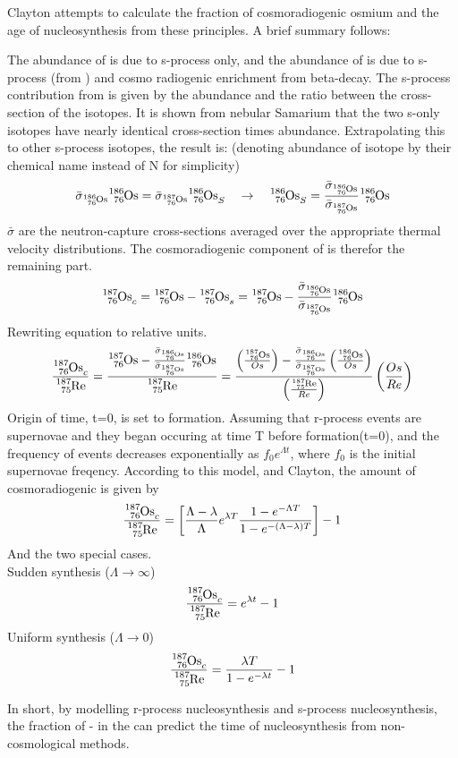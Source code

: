 Clayton attempts to calculate the fraction of cosmoradiogenic osmium and the age of nucleosynthesis from these principles.
A brief summary follows:

The abundance of  is due to s-process only, and the abundance of  is due to s-process (from ) and cosmo radiogenic enrichment from  beta-decay.
The s-process contribution from  is given by the  abundance and the ratio between the cross-section of the isotopes. It is shown from nebular Samarium that the two s-only isotopes have nearly identical cross-section times abundance. Extrapolating this to other s-process isotopes, the result is:
(denoting abundance of isotope by their chemical name instead of N for simplicity)
\begin{equation}
  \bar{\sigma}_{\os{186}}{\os{186}} = \bar{\sigma}_{\os{187}}{\os{186}_S}
  \quad \rightarrow \quad
  {\os{186}_S} = \frac{\bar{\sigma}_{\os{186}}}{\bar{\sigma}_{\os{187}}}{\os{186}}
\end{equation}
$\bar{\sigma}$ are the neutron-capture cross-sections averaged over the appropriate thermal velocity distributions.
The cosmoradiogenic component of  is therefor the remaining part.
\begin{equation}
  \os{187}_c = \os{187} - \os{187}_s = \os{187} - \frac{\bar{\sigma}_{\os{186}}}{\bar{\sigma}_{\os{187}}}{\os{186}}
\end{equation}
Rewriting equation to relative units.
\begin{equation}
  \frac{\os{187}_c}{\re{187}} = \frac{\os{187} - \frac{\bar{\sigma}_{\os{186}}}{\bar{\sigma}_{\os{187}}}{\os{186}}}{\re{187}} =
  \frac{
    \left(\frac{\os{187}}{Os}\right) -
    \frac{\bar{\sigma}_{\os{186}}}{\bar{\sigma}_{\os{187}}}
    \left(\frac{\os{186}}{Os}\right)
  }{
    \left(\frac{\re{187}}{Re}\right)
  }
  \left(\frac{Os}{Re}\right)
\end{equation}
Origin of time, t=0, is set to \sos formation. Assuming that r-process events are supernovae and they began occuring at time T before \sos formation(t=0), and the frequency of events decreases exponentially as $f_0e^{\Lambda t}$, where $f_0$ is the initial supernovae freqency.
According to this model, and Clayton, the amount of cosmoradiogenic  is given by
\begin{equation}
  \frac{\os{187}_c}{\re{187}} = \left[
    \frac{\Lambda-\lambda}{\Lambda}
    e^{\lambda T}
    \frac{1-e^{-\Lambda T}}{1-e^{-(\Lambda-\lambda) T}}
    \right] - 1
\end{equation}
And the two special cases. \\
Sudden synthesis ($\Lambda\rightarrow\infty$)
\begin{equation}
  \frac{\os{187}_c}{\re{187}} = e^{\lambda t} - 1
\end{equation}
Uniform synthesis ($\Lambda\rightarrow 0$)
\begin{equation}
  \frac{\os{187}_c}{\re{187}} = \frac{\lambda T}{1-e^{-\lambda t}} - 1
\end{equation}


In short, by modelling r-process nucleosynthesis and s-process nucleosynthesis, the fraction of - in the \sos can predict the time of nucleosynthesis from non-cosmological methods.
